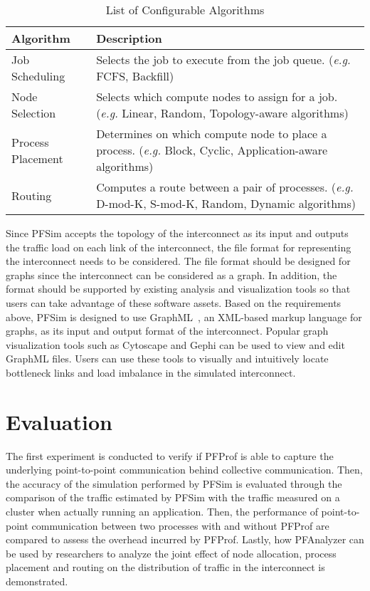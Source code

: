 \begin{table}
    \centering
    \normalsize
    \caption{List of Configurable Algorithms}%
    \label{tbl:simulator-algorithm}
    \begin{tabularx}{\linewidth}{lX}
        \toprule
        Algorithm         & Description                                                 \\
        \midrule
        Job Scheduling    & Selects the job to execute from the job queue.
                            (\emph{e.g.} FCFS, Backfill)                                \\
        Node Selection    & Selects which compute nodes to assign for a job.
                            (\emph{e.g.} Linear, Random, Topology-aware algorithms)     \\
        Process Placement & Determines on which compute node to place a process.
                            (\emph{e.g.} Block, Cyclic, Application-aware algorithms)   \\
        Routing           & Computes a route between a pair of processes.
                            (\emph{e.g.} D-mod-K, S-mod-K, Random, Dynamic algorithms)  \\
        \bottomrule
    \end{tabularx}
\end{table}

Since PFSim accepts the topology of the interconnect as its input and outputs
the traffic load on each link of the interconnect, the file format for
representing the interconnect needs to be considered. The file format should
be designed for graphs since the interconnect can be considered as a graph. In
addition, the format should be supported by existing analysis and
visualization tools so that users can take advantage of these software assets.
Based on the requirements above, PFSim is designed to use
GraphML~\autocite{Brandes2013}, an XML-based markup language for graphs, as
its input and output format of the interconnect. Popular graph visualization
tools such as Cytoscape and Gephi can be used to view and edit GraphML files.
Users can use these tools to visually and intuitively locate bottleneck links
and load imbalance in the simulated interconnect.

\section{Evaluation}\label{sec:ii-evaluation}

The first experiment is conducted to verify if PFProf is able to capture
the underlying point-to-point communication behind collective communication.
Then, the accuracy of the simulation performed by PFSim is evaluated through
the comparison of the traffic estimated by PFSim with the traffic measured on
a cluster when actually running an application. Then, the performance of
point-to-point communication between two processes with and without PFProf are
compared to assess the overhead incurred by PFProf. Lastly, how PFAnalyzer can
be used by researchers to analyze the joint effect of node allocation, process
placement and routing on the distribution of traffic in the interconnect is
demonstrated.

